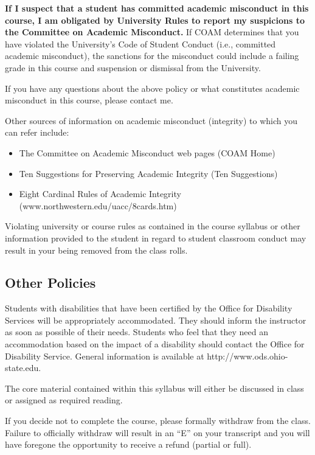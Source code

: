 \documentclass[12pt]{article}
\begin{document}
\textbf{If I suspect that a student has committed academic misconduct in this course, I am obligated by University Rules to report my suspicions to the Committee on Academic Misconduct.}
If COAM determines that you have violated the University’s Code of Student Conduct (i.e., committed academic misconduct), the sanctions for the misconduct could include a failing grade in this course and suspension or dismissal from the University.

If you have any questions about the above policy or what constitutes academic misconduct in this course, please contact me.

Other sources of information on academic misconduct (integrity) to which you can refer include:
\begin{itemize}
    \item The Committee on Academic Misconduct web pages (COAM Home)
    \item Ten Suggestions for Preserving Academic Integrity (Ten Suggestions)
    \item Eight Cardinal Rules of Academic Integrity (www.northwestern.edu/uacc/8cards.htm)
\end{itemize}

Violating university or course rules as contained in the course syllabus or other information provided to the student in regard to student classroom conduct may result in your being removed from the class rolls.

\subsection*{Other Policies}

Students with disabilities that have been certified by the Office for Disability Services will be appropriately accommodated.
They should inform the instructor as soon as possible of their needs.
Students who feel that they need an accommodation based on the impact of a disability should contact the Office for Disability Service.
General information is available at http://www.ods.ohio-state.edu.

The core material contained within this syllabus will either be discussed in class or assigned as required reading.

If you decide not to complete the course, please formally withdraw from the class.
Failure to officially withdraw will result in an ``E'' on your transcript and you will have foregone the opportunity to receive a refund (partial or full).
\end{document}
